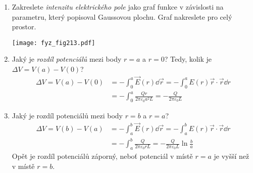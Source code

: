 \begin{example}
\begin{enumerate}
{          bodu, vyjádřete velikost intenzity elektrického pole.}
          \begin{equation*}
            2\pi r h E = \frac{1}{\varepsilon_0}\dfrac{r^2h}{a^2L}Q 
                       \Rightarrow E = \frac{Qr}{2\pi\varepsilon_0a^2L}
          \end{equation*}
          \emph{Zopakujte stejnou proceduru pro oblast \(a < r < b\), vyjádřete intenzitu
           elektrického pole jako funkci \(r\).} Náboj, který je uzavřen v ploše je 
           konstantní, se vzrůstajícím poloměrem r se však mění celková plocha válce.
          \begin{equation*}
            2\pi\,r\,h\,E = \frac{1}{\varepsilon_0}\dfrac{h}{L}Q 
                            \Rightarrow E = \frac{Q}{2\pi\varepsilon_0rL}
          \end{equation*}
    \item Zakreslete \emph{intenzitu elektrického pole} jako graf funkce v závislosti na 
          parametru, který popisoval Gaussovou plochu. Graf nakreslete pro celý prostor. 
          
           {\centering
            \captionsetup{type=figure}
            \texttt{[image: fyz\_fig213.pdf]}
            \par}
    \item Jaký je \emph{rozdíl potenciálů} mezi body \(r = a\) a \(r = 0\)? Tedy, kolik je
          \(\Delta V = V(a) − V(0)\)? 
          \begin{align*}
            \Delta V  = V(a) − V(0) &= -\int_0^a\vec{E}(r)\dd\vec{r}   
                                     = -\int_{0}^{a}E(r)\vec{r}\cdot\vec{r}\dd{r}    \\
                                    &= -\int_{0}^{a}\frac{Qr}{2\pi\varepsilon_0a^2L} 
                                     = -\frac{Q}{2\pi\varepsilon_0L}
          \end{align*}
    \item Jaký je rozdíl potenciálů mezi body \(r = b\) a \(r = a\)?
          \begin{align*}
            \Delta V  = V(b) − V(a) &= -\int_a^b\vec{E}(r)\dd\vec{r}   
                                     = -\int_a^b E(r)\vec{r}\cdot\vec{r}\dd{r}    \\
                                    &= -\int_a^b \frac{Q}{2\pi\varepsilon_0rL} 
                                     = -\frac{Q}{2\pi\varepsilon_0L}\ln\frac{b}{a}
          \end{align*}
          Opět je rozdíl potenciálů záporný, neboť potenciál v místě \(r = a\) je vyšší než v 
          místě \(r = b\).
  \end{enumerate}
\end{example}